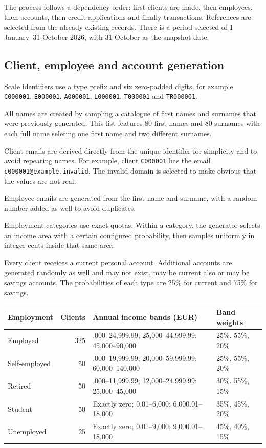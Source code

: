 \documentclass[11pt,a4paper]{article}
\begin{document}
The process follows a dependency order: first clients are made, then employees,
then accounts, then credit applications and finally transactions. References are selected from the 
already existing records. There is a period selected of 1 January--31 October 2026, with 31 October 
as the snapshot date.

\subsection{Client, employee and account generation}

Scale identifiers use a type prefix and six zero-padded digits, for example
\texttt{C000001}, \texttt{E000001}, \texttt{A000001}, \texttt{L000001},
\texttt{T000001} and \texttt{TR000001}.

All names are created by sampling a catalogue of first names and surnames that were previously
generated. This list features 80 first names and 80 surnames with each full name
seleting one first name and two different surnames. 

Client emails are derived directly from the unique identifier for simplicity and to avoid
repeating names. For example, client \texttt{C000001} has the email \texttt{c000001@example.invalid}.
The invalid domain is selected to make obvious that the values are not real.

Employee emails are generated from the first name and surname, with a random number added as well to
avoid duplicates.

Employment categories use exact quotas. Within a category, the generator
selects an income area with a certain configured probability, then samples
uniformly in integer cents inside that same area.

Every client receices a current personal account. Additional accounts are 
generated randomly as well and may not exist, may be current also or may be savings accounts.
The probabilities of each type are 25\% for current and 75\% for savings. 

\begingroup
\renewcommand{\arraystretch}{1.2}
\begin{tabularx}{\textwidth}{@{}p{2.5cm} r >{\raggedright\arraybackslash}X p{2.4cm}@{}}
\toprule
Employment & Clients & Annual income bands (EUR) & Band weights\\
\midrule
Employed & 325 & 15,000--24,999.99; 25,000--44,999.99; 45,000--90,000 & 25\%, 55\%, 20\%\\
Self-employed & 50 & 8,000--19,999.99; 20,000--59,999.99; 60,000--140,000 & 25\%, 55\%, 20\%\\
Retired & 50 & 6,000--11,999.99; 12,000--24,999.99; 25,000--45,000 & 30\%, 55\%, 15\%\\
Student & 50 & Exactly zero; 0.01--6,000; 6,000.01--18,000 & 35\%, 45\%, 20\%\\
Unemployed & 25 & Exactly zero; 0.01--9,000; 9,000.01--18,000 & 45\%, 40\%, 15\%\\
\bottomrule
\end{tabularx}
\endgroup
\end{document}
